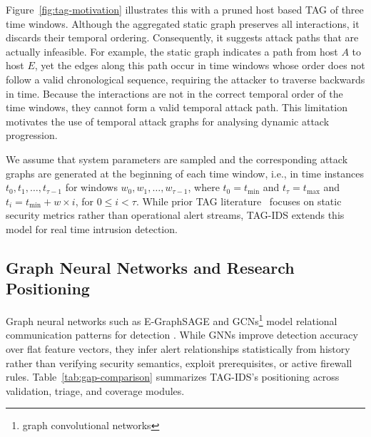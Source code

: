 \documentclass[runningheads]{llncs}
\begin{document}
Figure~\ref{fig:tag-motivation} illustrates this with a pruned host based TAG of three time windows. Although the aggregated static graph preserves all interactions, it discards their temporal ordering. Consequently, it suggests attack paths that are actually infeasible. For example, the static graph indicates a path from host $A$ to host $E$, yet the edges along this path occur in time windows whose order does not follow a valid chronological sequence, requiring the attacker to traverse backwards in time. Because the interactions are not in the correct temporal order of the time windows, they cannot form a valid temporal attack path. This limitation motivates the use of temporal attack graphs for analysing dynamic attack progression.

We assume that system parameters are sampled and the corresponding attack graphs are generated at the beginning of each time window, i.e., in time instances $t_0, t_1, \ldots, t_{\tau-1}$ for windows $w_0, w_1, \ldots, w_{\tau-1}$, where $t_0 = t_{\min}$ and $t_{\tau} = t_{\max}$ and $t_i = t_{\min}+w\times i$, for $0 \le i < \tau$. While prior TAG literature~\cite{Gain2023} focuses on static security metrics rather than operational alert streams, TAG-IDS extends this model for real time intrusion detection.

\subsection{Graph Neural Networks and Research Positioning}
Graph neural networks such as E-GraphSAGE and GCNs\footnote{graph convolutional networks} model relational communication patterns for detection \cite{Friji2023,Sun2024}. While GNNs improve detection accuracy over flat feature vectors, they infer alert relationships statistically from history rather than verifying security semantics, exploit prerequisites, or active firewall rules. Table~\ref{tab:gap-comparison} summarizes TAG-IDS's positioning across validation, triage, and coverage modules.
\end{document}
